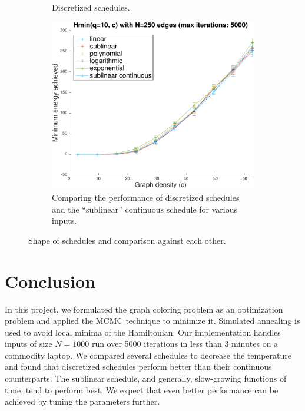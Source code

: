 \documentclass{article}
\begin{document}
\begin{figure}[h]
\begin{subfigure}[t]{.33\linewidth}
      \caption{Discretized schedules.}
      \label{fig:schedules_discretized_shape}
    \end{subfigure}%
    \begin{subfigure}[t]{.33\linewidth} %
      \centering
      \includegraphics[width=1\linewidth]{figures/schedules_evaluation.pdf}
      \caption{Comparing the performance of discretized schedules and the ``sublinear'' continuous schedule for various inputs.}
      \label{fig:schedules_evaluation}
    \end{subfigure}
    \caption{Shape of schedules and comparison against each other.}
    \label{fig:schedules}
  \end{figure}


  \section*{Conclusion}
  In this project, we formulated the graph coloring problem as an optimization problem and applied the MCMC technique to minimize it. Simulated annealing is used to avoid local minima of the Hamiltonian. Our implementation handles inputs of size $N=1000$ run over 5000 iterations in less than 3 minutes on a commodity laptop. We compared several schedules to decrease the temperature and found that discretized schedules perform better than their continuous counterparts. The sublinear schedule, and generally, slow-growing functions of time, tend to perform best. We expect that even better performance can be achieved by tuning the parameters further.
\end{document}

